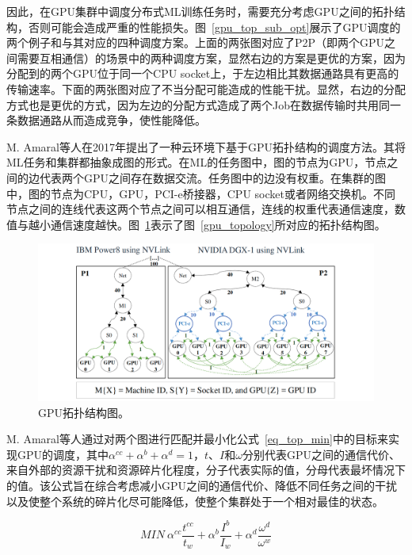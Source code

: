 因此，在GPU集群中调度分布式ML训练任务时，需要充分考虑GPU之间的拓扑结构，否则可能会造成严重的性能损失。图~\ref{gpu_top_sub_opt}展示了GPU调度的两个例子和与其对应的四种调度方案。上面的两张图对应了P2P（即两个GPU之间需要互相通信）的场景中的两种调度方案，显然右边的方案是更优的方案，因为分配到的两个GPU位于同一个CPU socket上，于左边相比其数据通路具有更高的传输速率。下面的两张图对应了不当分配可能造成的性能干扰。显然，右边的分配方式也是更优的方式，因为左边的分配方式造成了两个Job在数据传输时共用同一条数据通路从而造成竞争，使性能降低。

M. Amaral等人\parencite{amaral2017topology}在2017年提出了一种云环境下基于GPU拓扑结构的调度方法。其将ML任务和集群都抽象成图的形式。在ML的任务图中，图的节点为GPU，节点之间的边代表两个GPU之间存在数据交流。任务图中的边没有权重。在集群的图中，图的节点为CPU，GPU，PCI-e桥接器，CPU socket或者网络交换机。不同节点之间的连线代表这两个节点之间可以相互通信，连线的权重代表通信速度，数值与越小通信速度越快。图~\ref{gpu_graph}表示了图~\ref{gpu_topology}所对应的拓扑结构图。

\begin{figure}[h]
    \centerline{\includegraphics[width=\textwidth]{figures/gpu-graph.png}}
    \caption{GPU拓扑结构图。}
    \label{gpu_graph}
\end{figure}

M. Amaral等人通过对两个图进行匹配并最小化公式~\ref{eq_top_min}中的目标来实现GPU的调度，其中$\alpha^{cc}+\alpha^b+\alpha^d=1$，$t$、$I$和$\omega$分别代表GPU之间的通信代价、来自外部的资源干扰和资源碎片化程度，分子代表实际的值，分母代表最坏情况下的值。该公式旨在综合考虑减小GPU之间的通信代价、降低不同任务之间的干扰以及使整个系统的碎片化尽可能降低，使整个集群处于一个相对最佳的状态。

\begin{equation}\label{eq_top_min}
    MIN\ \alpha^{cc}\frac{t^{cc}}{t_w}+\alpha^b\frac{I^b}{I_w}+\alpha^d\frac{\omega^d}{\omega^w}
\end{equation}

